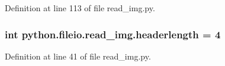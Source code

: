 Definition at line 113 of file read\-\_\-img.\-py.

\hypertarget{namespacepython_1_1fileio_1_1read__img_abcc43c5b7904c6f21fbf4ff8898911b0}{
\subsubsection[{headerlength}]{\setlength{\rightskip}{0pt plus 5cm}int python.\-fileio.\-read\-\_\-img.\-headerlength = 4}}\label{namespacepython_1_1fileio_1_1read__img_abcc43c5b7904c6f21fbf4ff8898911b0}


Definition at line 41 of file read\-\_\-img.\-py.


